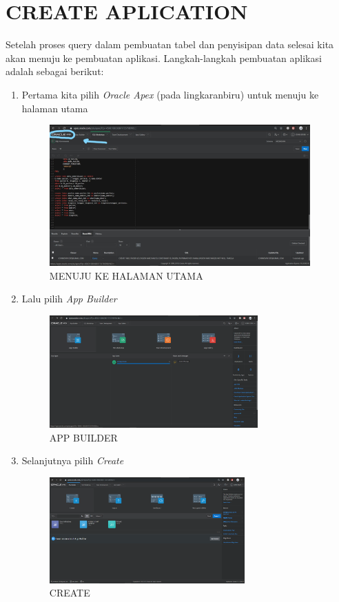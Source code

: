 \documentclass[a4paper, 12pt]{article}
\begin{document}
\section{CREATE APLICATION}
Setelah proses query dalam pembuatan tabel dan penyisipan data selesai kita akan menuju ke pembuatan aplikasi. Langkah-langkah pembuatan aplikasi adalah sebagai berikut:
\begin{enumerate}
\item Pertama kita pilih \textit{Oracle Apex} (pada lingkaran\textunderscore biru) untuk menuju ke halaman utama
\begin{figure}[h]
\begin{center}
\includegraphics[width=10cm]{figure/H1.png}
\caption{MENUJU KE HALAMAN UTAMA}
\end{center}
\end{figure}

\item Lalu pilih \textit{App Builder}
\begin{figure}[h]
\begin{center}
\includegraphics[width=8cm]{figure/AB.png}
\caption{APP BUILDER}
\end{center}
\end{figure}

\item Selanjutnya pilih \textit{Create}
\begin{figure}[h]
\begin{center}
\includegraphics[width=7.5cm]{figure/C.png}
\caption{CREATE}
\end{center}
\end{figure}


\end{enumerate}
\end{document}
